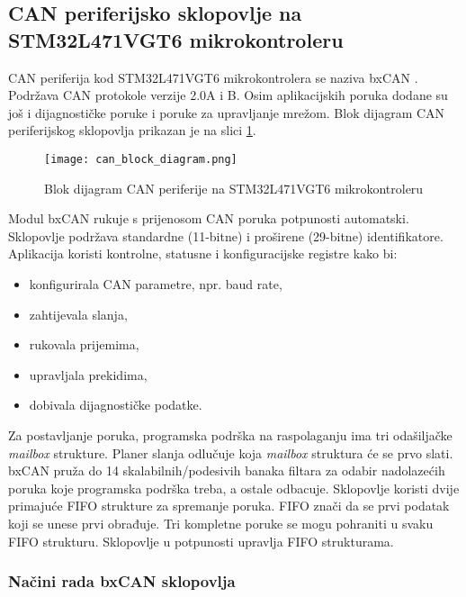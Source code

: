 \subsection{CAN periferijsko sklopovlje na STM32L471VGT6 mikrokontroleru}

CAN periferija kod STM32L471VGT6 mikrokontrolera se naziva bxCAN . Podržava CAN protokole verzije 2.0A i B. Osim aplikacijskih poruka dodane su još i dijagnostičke poruke i poruke za upravljanje mrežom. Blok dijagram CAN periferijskog sklopovlja prikazan je na slici \ref{fig:can_block_diagram}.
\begin{figure}[H]
	\centering
	\texttt{[image: can\_block\_diagram.png]}
	\caption{Blok dijagram CAN periferije na STM32L471VGT6 mikrokontroleru}
	\label{fig:can_block_diagram}
\end{figure}
Modul bxCAN rukuje s prijenosom CAN poruka potpunosti automatski. Sklopovlje podržava standardne (11-bitne) i proširene (29-bitne) identifikatore. Aplikacija koristi kontrolne, statusne i konfiguracijske registre kako bi:
\begin{itemize}
	\item konfigurirala CAN parametre, npr. baud rate,
	\item zahtijevala slanja,
	\item rukovala prijemima,
	\item upravljala prekidima,
	\item dobivala dijagnostičke podatke.
\end{itemize}
Za postavljanje poruka, programska podrška na raspolaganju ima tri odašiljačke \textit{mailbox} strukture. Planer slanja odlučuje koja \textit{mailbox} struktura će se prvo slati. bxCAN pruža do 14 skalabilnih/podesivih banaka filtara za odabir nadolazećih poruka koje programska podrška treba, a ostale odbacuje. Sklopovlje koristi dvije primajuće FIFO  strukture za spremanje poruka. FIFO znači da se prvi podatak koji se unese prvi obrađuje. Tri kompletne poruke se mogu pohraniti u svaku FIFO strukturu. Sklopovlje u potpunosti upravlja FIFO strukturama.

\subsubsection{Načini rada bxCAN sklopovlja}

